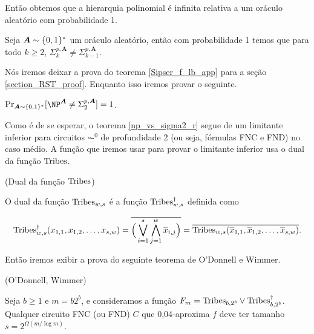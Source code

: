 Então obtemos que a hierarquia polinomial é infinita relativa a um oráculo aleatório com probabilidade 1.

\begin{teo} \label{ph_no_collapse_random}
    Seja $\boldsymbol{A} \sim \{0, 1\}^{*}$ um oráculo aleatório, então com probabilidade 1 temos que para todo $k \geq 2$, $\Sigma_{k}^{p, \boldsymbol{A}} \neq \Sigma_{k - 1}^{p, \boldsymbol{A}}$.    
\end{teo}

Nós iremos deixar a prova do teorema \ref{Sipser_f_lb_app} para a seção \ref{section_RST_proof}. Enquanto isso iremos provar o seguinte.

\begin{teo} \label{np_vs_sigma2_r}
	$\Pr_{\boldsymbol{A} \sim \binalph^{*}}[\NP^{\boldsymbol{A}} \neq \Sigma_{2}^{p, \boldsymbol{A}}] = 1$.
\end{teo}

Como é de se esperar, o teorema \ref{np_vs_sigma2_r} segue de um limitante inferior para circuitos $\AC^{0}$ de profundidade 2 (ou seja, fórmulas FNC e FND) no caso médio. A função que iremos usar para provar o limitante inferior usa o dual da função $\text{Tribes}$.

\begin{defi} (Dual da função $\text{Tribes}$)

O dual da função $\text{Tribes}_{w, s}$ é a função $\text{Tribes}_{w, s}^{\dagger}$ definida como

\begin{equation*}
	\text{Tribes}_{w, s}^{\dagger}(x_{1, 1}, x_{1,2}, \dots, x_{s, w})  = \overline{\Big(\bigvee_{i = 1}^{s}\bigwedge_{j = 1}^{w} \overline{x}_{i, j}\Big)} = \overline{\text{Tribes}_{w, s}(\overline{x}_{1, 1}, \overline{x}_{1, 2}, \dots, \overline{x}_{s, w})}.
\end{equation*}

\end{defi}

Então iremos exibir a prova do seguinte teorema de O'Donnell e Wimmer.

\begin{teo} (O'Donnell, Wimmer) \label{odonnell_wimmer}

Seja $b \geq 1$ e $m = b2^{b}$, e consideramos a função $F_{m} = \text{Tribes}_{b, 2^{b}} \lor \text{Tribes}_{b, 2^{b}}^{\dagger}$. Qualquer circuito FNC (ou FND) $C$ que  0,04-aproxima $f$ deve ter tamanho $s = 2^{\Omega(m/\log m)}$.

\end{teo}

